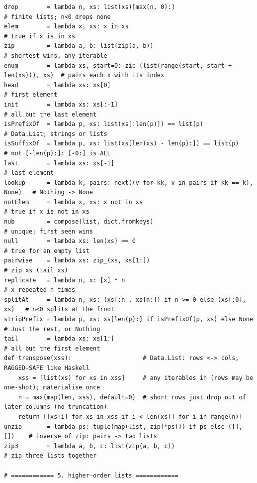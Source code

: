 \documentclass[10pt,letterpaper]{book}
\begin{document}
\begin{lstlisting}[style=file]
drop        = lambda n, xs: list(xs)[max(n, 0):]                           # finite lists; n<0 drops none
elem        = lambda x, xs: x in xs                                        # true if x is in xs
zip_        = lambda a, b: list(zip(a, b))                                 # shortest wins, any iterable
enum        = lambda xs, start=0: zip_(list(range(start, start + len(xs))), xs)  # pairs each x with its index
head        = lambda xs: xs[0]                                             # first element
init        = lambda xs: xs[:-1]                                           # all but the last element
isPrefixOf  = lambda p, xs: list(xs[:len(p)]) == list(p)                   # Data.List; strings or lists
isSuffixOf  = lambda p, xs: list(xs[len(xs) - len(p):]) == list(p)         # not [-len(p):]: [-0:] is ALL
last        = lambda xs: xs[-1]                                            # last element
lookup      = lambda k, pairs: next((v for kk, v in pairs if kk == k), None)   # Nothing -> None
notElem     = lambda x, xs: x not in xs                                    # true if x is not in xs
nub         = compose(list, dict.fromkeys)                                 # unique; first seen wins
null        = lambda xs: len(xs) == 0                                      # true for an empty list
pairwise    = lambda xs: zip_(xs, xs[1:])                                  # zip xs (tail xs)
replicate   = lambda n, x: [x] * n                                         # x repeated n times
splitAt     = lambda n, xs: (xs[:n], xs[n:]) if n >= 0 else (xs[:0], xs)   # n<0 splits at the front
stripPrefix = lambda p, xs: xs[len(p):] if isPrefixOf(p, xs) else None     # Just the rest, or Nothing
tail        = lambda xs: xs[1:]                                            # all but the first element
def transpose(xss):                    # Data.List: rows <-> cols, RAGGED-SAFE like Haskell
    xss = [list(xs) for xs in xss]     # any iterables in (rows may be one-shot); materialise once
    n = max(map(len, xss), default=0)  # short rows just drop out of later columns (no truncation)
    return [[xs[i] for xs in xss if i < len(xs)] for i in range(n)]
unzip       = lambda ps: tuple(map(list, zip(*ps))) if ps else ([], [])    # inverse of zip: pairs -> two lists
zip3        = lambda a, b, c: list(zip(a, b, c))                           # zip three lists together

# ============ 5. higher-order lists ============


\end{lstlisting}
\end{document}
